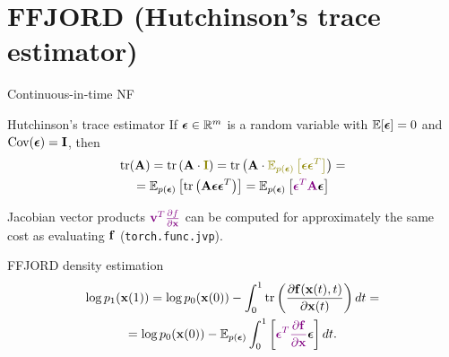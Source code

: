 \section{FFJORD (Hutchinson's trace estimator)}
\begin{frame}{Continuous-in-time NF}
	\begin{block}{Hutchinson's trace estimator}
		If $\boldsymbol{\epsilon} \in \mathbb{R}^m$ is a random variable with $\mathbb{E} [\boldsymbol{\epsilon}] = 0$ and $\text{Cov} (\boldsymbol{\epsilon}) = \mathbf{I}$, then
		\vspace{-0.3cm}
		\begin{multline*}
		    \text{tr}(\mathbf{A}) = \text{tr}\left(\mathbf{A} \cdot {\color{olive}\bI} \right) = \text{tr}\left(\mathbf{A} \cdot {\color{olive}\mathbb{E}_{p(\bepsilon)} \left[ \bepsilon \bepsilon^T \right]} \right) = \\ 
		    =  \mathbb{E}_{p(\bepsilon)} \left[  \text{tr}\left(  \mathbf{A}  \bepsilon \bepsilon^T \right) \right] =  \mathbb{E}_{p(\bepsilon)} \left[ {\color{violet} \bepsilon^T \mathbf{A}} \bepsilon  \right]
		\end{multline*}
		\vspace{-0.6 cm}
	\end{block}
	Jacobian vector products ${\color{violet}\mathbf{v}^T \frac{\partial f}{\partial \mathbf{x}}}$ can be computed for approximately the same cost as evaluating $\mathbf{f}$ (\texttt{torch.func.jvp}).
	\begin{block}{FFJORD density estimation}
		\vspace{-0.8cm}
		\begin{multline*}
		    \log p_1(\mathbf{x}(1)) = \log p_0(\mathbf{x}(0)) - \int_{0}^{1} \text{tr}  \left( \frac{\partial \mathbf{f}(\mathbf{x}(t), t)}{\partial \mathbf{x}(t)} \right) dt = \\ = \log p_0(\mathbf{x}(0)) - \mathbb{E}_{p(\boldsymbol{\epsilon})} \int_{0}^{1} \left[ {\color{violet}\boldsymbol{\epsilon}^T \frac{\partial \mathbf{f}}{\partial \mathbf{x}}} \boldsymbol{\epsilon} \right] dt.
		\end{multline*}
	\end{block}
\end{frame}

